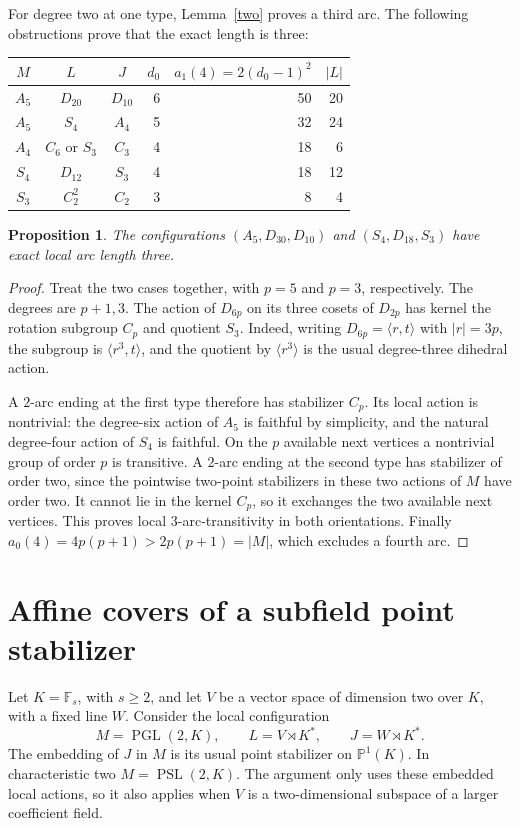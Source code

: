 \documentclass[11pt]{article}
\newtheorem{proposition}[lemma]{Proposition}
\newcommand{\PSL}{\operatorname{PSL}}
\newcommand{\PGL}{\operatorname{PGL}}
\newcommand{\F}{\mathbb F}
\begin{document}
For degree two at one type, Lemma~\ref{two} proves a third arc. The
following obstructions prove that the exact length is three:
\begin{center}
\begin{tabular}{cccrrr}
\toprule
$M$&$L$&$J$&$d_0$&$a_1(4)=2(d_0-1)^2$&$|L|$\\\midrule
$A_5$&$D_{20}$&$D_{10}$&6&50&20\\
$A_5$&$S_4$&$A_4$&5&32&24\\
$A_4$&$C_6$ or $S_3$&$C_3$&4&18&6\\
$S_4$&$D_{12}$&$S_3$&4&18&12\\
$S_3$&$C_2^2$&$C_2$&3&8&4\\\bottomrule
\end{tabular}
\end{center}

\begin{proposition}\label{prime}
The configurations $(A_5,D_{30},D_{10})$ and $(S_4,D_{18},S_3)$
have exact local arc length three.
\end{proposition}
\begin{proof}
Treat the two cases together, with $p=5$ and $p=3$, respectively.
The degrees are $p+1,3$. The action of $D_{6p}$ on its three cosets
of $D_{2p}$ has kernel the rotation subgroup $C_p$ and quotient $S_3$.
Indeed, writing $D_{6p}=\langle r,t\rangle$ with $|r|=3p$, the
subgroup is $\langle r^3,t\rangle$, and the quotient by
$\langle r^3\rangle$ is the usual degree-three dihedral action.

A $2$-arc ending at the first type therefore has stabilizer $C_p$.
Its local action is nontrivial: the degree-six action of $A_5$ is
faithful by simplicity, and the natural degree-four action of $S_4$
is faithful. On the $p$ available next vertices a nontrivial group
of order $p$ is transitive. A $2$-arc ending at the second type has
stabilizer of order two, since the pointwise two-point stabilizers in
these two actions of $M$ have order two. It cannot lie in the kernel
$C_p$, so it exchanges the two available next vertices. This proves
local $3$-arc-transitivity in both orientations. Finally
$a_0(4)=4p(p+1)>2p(p+1)=|M|$, which excludes a fourth arc.
\end{proof}

\section{Affine covers of a subfield point stabilizer}
Let $K=\F_s$, with $s\ge2$, and let $V$ be a vector space of dimension
two over $K$, with a fixed line $W$. Consider the local configuration
\[
 M=\PGL(2,K),\qquad L=V\rtimes K^*,\qquad
 J=W\rtimes K^*.
\]
The embedding of $J$ in $M$ is its usual point stabilizer on
$\mathbb P^1(K)$. In characteristic two $M=\PSL(2,K)$.
The argument only uses these embedded local actions, so it also applies
when $V$ is a two-dimensional subspace of a larger coefficient field.
\end{document}

